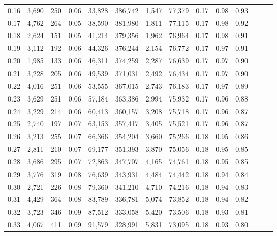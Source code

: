 \begin{tabular}{rrrrrrrrrrrrrr}
0.16 &   3,690 &    250 &  0.06 &   33,828 &  386,742 &   1,547 &  77,379 &  0.17 &  0.98 &      0.93 \\
0.17 &   4,762 &    264 &  0.05 &   38,590 &  381,980 &   1,811 &  77,115 &  0.17 &  0.98 &      0.92 \\
0.18 &   2,624 &    151 &  0.05 &   41,214 &  379,356 &   1,962 &  76,964 &  0.17 &  0.98 &      0.91 \\
0.19 &   3,112 &    192 &  0.06 &   44,326 &  376,244 &   2,154 &  76,772 &  0.17 &  0.97 &      0.91 \\
0.20 &   1,985 &    133 &  0.06 &   46,311 &  374,259 &   2,287 &  76,639 &  0.17 &  0.97 &      0.90 \\
0.21 &   3,228 &    205 &  0.06 &   49,539 &  371,031 &   2,492 &  76,434 &  0.17 &  0.97 &      0.90 \\
0.22 &   4,016 &    251 &  0.06 &   53,555 &  367,015 &   2,743 &  76,183 &  0.17 &  0.97 &      0.89 \\
0.23 &   3,629 &    251 &  0.06 &   57,184 &  363,386 &   2,994 &  75,932 &  0.17 &  0.96 &      0.88 \\
0.24 &   3,229 &    214 &  0.06 &   60,413 &  360,157 &   3,208 &  75,718 &  0.17 &  0.96 &      0.87 \\
0.25 &   2,740 &    197 &  0.07 &   63,153 &  357,417 &   3,405 &  75,521 &  0.17 &  0.96 &      0.87 \\
0.26 &   3,213 &    255 &  0.07 &   66,366 &  354,204 &   3,660 &  75,266 &  0.18 &  0.95 &      0.86 \\
0.27 &   2,811 &    210 &  0.07 &   69,177 &  351,393 &   3,870 &  75,056 &  0.18 &  0.95 &      0.85 \\
0.28 &   3,686 &    295 &  0.07 &   72,863 &  347,707 &   4,165 &  74,761 &  0.18 &  0.95 &      0.85 \\
0.29 &   3,776 &    319 &  0.08 &   76,639 &  343,931 &   4,484 &  74,442 &  0.18 &  0.94 &      0.84 \\
0.30 &   2,721 &    226 &  0.08 &   79,360 &  341,210 &   4,710 &  74,216 &  0.18 &  0.94 &      0.83 \\
0.31 &   4,429 &    364 &  0.08 &   83,789 &  336,781 &   5,074 &  73,852 &  0.18 &  0.94 &      0.82 \\
0.32 &   3,723 &    346 &  0.09 &   87,512 &  333,058 &   5,420 &  73,506 &  0.18 &  0.93 &      0.81 \\
0.33 &   4,067 &    411 &  0.09 &   91,579 &  328,991 &   5,831 &  73,095 &  0.18 &  0.93 &      0.80 \\

\end{tabular}
